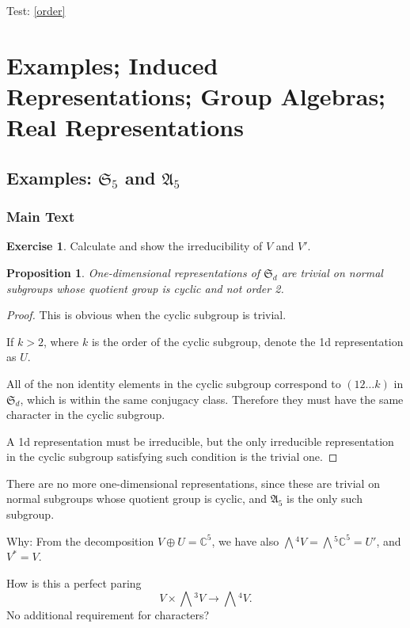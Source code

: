 \documentclass[12pt, letterpaper]{article}
\newcommand{\co}{\mathbb{C}}
\newcommand{\ext}[1]{\bigwedge\!^{#1}}
\newcommand{\red}[1]{{\color{red} #1}}
\newtheorem{prop}{Proposition}[section]
\theoremstyle{definition}
\theoremstyle{remark}
\theoremstyle{definition}
\newtheorem{exe}{Exercise}[section]
\theoremstyle{plain}
\numberwithin{equation}{section}
\begin{document}
	Test: \ref{order}
	
	\section{Examples; Induced Representations; Group Algebras; Real Representations}
	\subsection{Examples: $\mathfrak{S}_5$ and $\mathfrak{A}_5$}
	\subsubsection{Main Text}
	\begin{exe}
		Calculate and show the irreducibility of $V$ and $V'$.
	\end{exe}
	\begin{prop}
		One-dimensional representations of $\mathfrak{S}_d$
		are trivial on normal subgroups whose quotient group is cyclic and not order 2.
	\end{prop}
	\begin{proof}
		This is obvious when the cyclic subgroup is trivial.
		
		If $k>2$, where $k$ is the order of the cyclic subgroup,
		denote the 1d representation as $U$.
		
		All of the non identity elements in the cyclic subgroup correspond to
		$(12\dots k)$ in $\mathfrak{S}_d$, which is within the same conjugacy class.
		Therefore they must have the same character in the cyclic subgroup.
		
		A 1d representation must be irreducible, but the only irreducible representation
		in the cyclic subgroup
		satisfying such condition is the trivial one.
		
	\end{proof}

	\red{There are no more one-dimensional representations, since 
		these are trivial on normal subgroups whose quotient group is cyclic, and $\mathfrak{A}_5$
	is the only such subgroup.}

	\red{Why: From the decomposition $V \oplus U = \co^5$,
		we have also $\ext{4}V = \ext{5}\co^5 = U'$, 
		and $V^* = V$.}

	\red{How is this a perfect paring \[V\times \ext{3}V \to \ext{4}V. \]
	No additional requirement for characters?}
\end{document}
